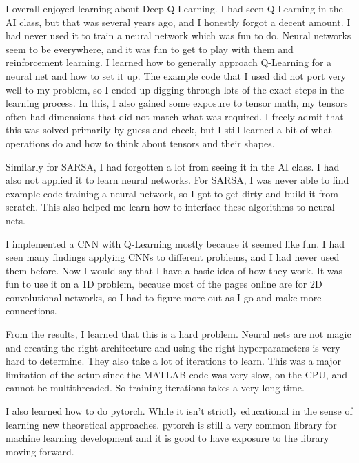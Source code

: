 \documentclass[11pt]{article}
\begin{document}
I overall enjoyed learning about Deep Q-Learning.
I had seen Q-Learning in the AI class, but that was several years ago, and I honestly forgot a decent amount.
I had never used it to train a neural network which was fun to do. 
Neural networks seem to be everywhere, and it was fun to get to play with them and reinforcement learning. 
I learned how to generally approach Q-Learning for a neural net and how to set it up.
The example code that I used did not port very well to my problem, so I ended up digging through lots of the exact steps in the learning process.
In this, I also gained some exposure to tensor math, my tensors often had dimensions that did not match what was required.
I freely admit that this was solved primarily by guess-and-check, but I still learned a bit of what operations do and how to think about tensors and their shapes. 

Similarly for SARSA, I had forgotten a lot from seeing it in the AI class. 
I had also not applied it to learn neural networks.
For SARSA, I was never able to find example code training a neural network, so I got to get dirty and build it from scratch.
This also helped me learn how to interface these algorithms to neural nets. 

I implemented a CNN with Q-Learning mostly because it seemed like fun.
I had seen many findings applying CNNs to different problems, and I had never used them before.
Now I would say that I have a basic idea of how they work. 
It was fun to use it on a 1D problem, because most of the pages online are for 2D convolutional networks, 
so I had to figure more out as I go and make more connections.

From the results, I learned that this is a hard problem. Neural nets are not magic and creating the right architecture and using the right hyperparameters 
is very hard to determine. 
They also take a lot of iterations to learn. This was a major limitation of the setup since the MATLAB code was very slow, on the CPU, and cannot be multithreaded.
So training iterations takes a very long time. 

I also learned how to do pytorch. While it isn't strictly educational in the sense of learning new theoretical approaches.
pytorch is still a very common library for machine learning development and it is good to have exposure to the library moving forward.


\singlespacing


\end{document}
